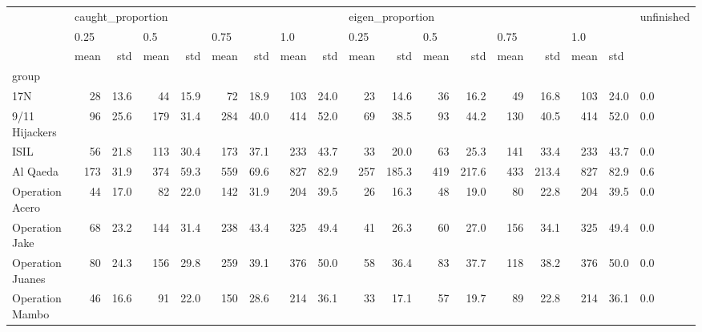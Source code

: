 \begin{tabular}{lrrrrrrrrrrrrrrrrl}
\toprule
{} & \multicolumn{8}{l}{caught\_proportion} & \multicolumn{8}{l}{eigen\_proportion} & unfinished \\
{} & \multicolumn{2}{l}{0.25} & \multicolumn{2}{l}{0.5} & \multicolumn{2}{l}{0.75} & \multicolumn{2}{l}{1.0} & \multicolumn{2}{l}{0.25} & \multicolumn{2}{l}{0.5} & \multicolumn{2}{l}{0.75} & \multicolumn{3}{l}{1.0} \\
{} &              mean &   std & mean &   std & mean &   std & mean &   std &             mean &    std & mean &    std & mean &    std & mean & \multicolumn{2}{l}{std} \\
group                &                   &       &      &       &      &       &      &       &                  &        &      &        &      &        &      &       &            \\
\midrule
17N                  &                28 &  13.6 &   44 &  15.9 &   72 &  18.9 &  103 &  24.0 &               23 &   14.6 &   36 &   16.2 &   49 &   16.8 &  103 &  24.0 &        0.0 \\
9/11 Hijackers       &                96 &  25.6 &  179 &  31.4 &  284 &  40.0 &  414 &  52.0 &               69 &   38.5 &   93 &   44.2 &  130 &   40.5 &  414 &  52.0 &        0.0 \\
ISIL                 &                56 &  21.8 &  113 &  30.4 &  173 &  37.1 &  233 &  43.7 &               33 &   20.0 &   63 &   25.3 &  141 &   33.4 &  233 &  43.7 &        0.0 \\
Al Qaeda             &               173 &  31.9 &  374 &  59.3 &  559 &  69.6 &  827 &  82.9 &              257 &  185.3 &  419 &  217.6 &  433 &  213.4 &  827 &  82.9 &        0.6 \\
Operation Acero      &                44 &  17.0 &   82 &  22.0 &  142 &  31.9 &  204 &  39.5 &               26 &   16.3 &   48 &   19.0 &   80 &   22.8 &  204 &  39.5 &        0.0 \\
Operation Jake       &                68 &  23.2 &  144 &  31.4 &  238 &  43.4 &  325 &  49.4 &               41 &   26.3 &   60 &   27.0 &  156 &   34.1 &  325 &  49.4 &        0.0 \\
Operation Juanes     &                80 &  24.3 &  156 &  29.8 &  259 &  39.1 &  376 &  50.0 &               58 &   36.4 &   83 &   37.7 &  118 &   38.2 &  376 &  50.0 &        0.0 \\
Operation Mambo      &                46 &  16.6 &   91 &  22.0 &  150 &  28.6 &  214 &  36.1 &               33 &   17.1 &   57 &   19.7 &   89 &   22.8 &  214 &  36.1 &        0.0 \\

\end{tabular}
